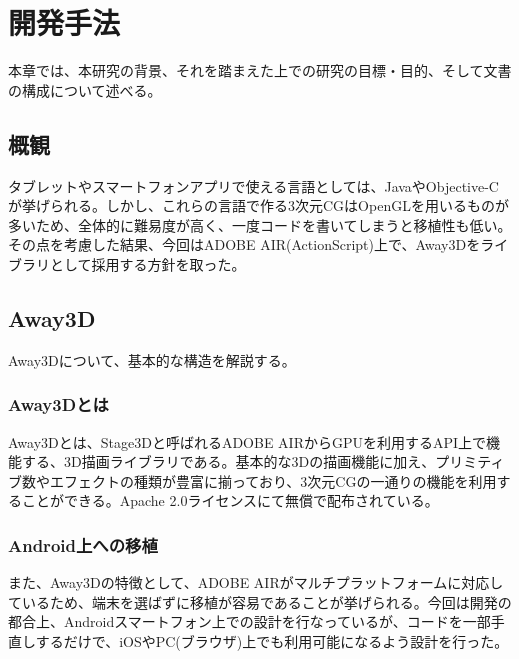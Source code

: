 \chapter{開発手法}
\label{chap:coding}

本章では、本研究の背景、それを踏まえた上での研究の目標・目的、そして文書の構成について述べる。

\section{概観}
タブレットやスマートフォンアプリで使える言語としては、JavaやObjective-Cが挙げられる。しかし、これらの言語で作る3次元CGはOpenGLを用いるものが多いため、全体的に難易度が高く、一度コードを書いてしまうと移植性も低い。その点を考慮した結果、今回はADOBE AIR(ActionScript)上で、Away3Dをライブラリとして採用する方針を取った。

\section{Away3D}
Away3Dについて、基本的な構造を解説する。

\subsection{Away3Dとは}
Away3D\cite{away3d}とは、Stage3Dと呼ばれるADOBE AIRからGPUを利用するAPI上で機能する、3D描画ライブラリである。基本的な3Dの描画機能に加え、プリミティブ数やエフェクトの種類が豊富に揃っており、3次元CGの一通りの機能を利用することができる。Apache 2.0ライセンスにて無償で配布されている。

\subsection{Android上への移植}
また、Away3Dの特徴として、ADOBE AIRがマルチプラットフォームに対応しているため、端末を選ばずに移植が容易であることが挙げられる。今回は開発の都合上、Androidスマートフォン上での設計を行なっているが、コードを一部手直しするだけで、iOSやPC(ブラウザ)上でも利用可能になるよう設計を行った。